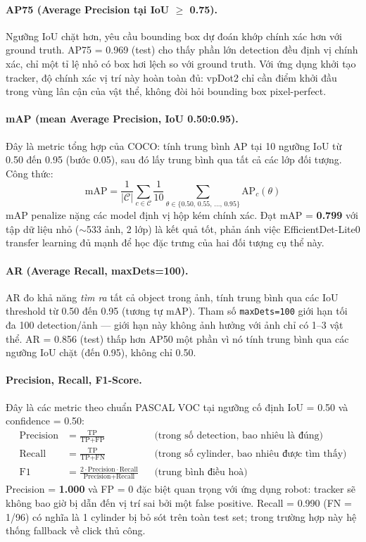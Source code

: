 \paragraph{AP75 (Average Precision tại IoU $\geq$ 0.75).}
Ngưỡng IoU chặt hơn, yêu cầu bounding box dự đoán khớp chính
xác hơn với ground truth. AP75 = 0.969 (test) cho thấy phần lớn
detection đều định vị chính xác, chỉ một tỉ lệ nhỏ có box hơi
lệch so với ground truth. Với ứng dụng khởi tạo tracker, độ
chính xác vị trí này hoàn toàn đủ: vpDot2 chỉ cần điểm khởi đầu
trong vùng lân cận của vật thể, không đòi hỏi bounding box
pixel-perfect.

\paragraph{mAP (mean Average Precision, IoU 0.50:0.95).}
Đây là metric tổng hợp của COCO: tính trung bình AP tại 10
ngưỡng IoU từ 0.50 đến 0.95 (bước 0.05), sau đó lấy trung bình
qua tất cả các lớp đối tượng. Công thức:
\[
  \text{mAP}
  = \frac{1}{|\mathcal{C}|}
    \sum_{c \in \mathcal{C}}
    \frac{1}{10}
    \sum_{\theta \in \{0.50,\,0.55,\,\ldots,\,0.95\}}
    \text{AP}_{c}(\theta)
\]
mAP penalize nặng các model định vị hộp kém chính xác. Đạt
mAP = \textbf{0.799} với tập dữ liệu nhỏ ($\sim$533 ảnh, 2 lớp)
là kết quả tốt, phản ánh việc EfficientDet-Lite0 transfer
learning đủ mạnh để học đặc trưng của hai đối tượng cụ thể này.

\paragraph{AR (Average Recall, maxDets=100).}
AR đo khả năng \textit{tìm ra} tất cả object trong ảnh, tính trung
bình qua các IoU threshold từ 0.50 đến 0.95 (tương tự mAP). Tham
số \texttt{maxDets=100} giới hạn tối đa 100 detection/ảnh --- giới
hạn này không ảnh hưởng với ảnh chỉ có 1--3 vật thể. AR = 0.856
(test) thấp hơn AP50 một phần vì nó tính trung bình qua các
ngưỡng IoU chặt (đến 0.95), không chỉ 0.50.

\paragraph{Precision, Recall, F1-Score.}
Đây là các metric theo chuẩn PASCAL VOC tại ngưỡng cố định
IoU = 0.50 và confidence = 0.50:
\begin{align*}
  \text{Precision} &= \frac{\text{TP}}{\text{TP}+\text{FP}}
    &&\text{(trong số detection, bao nhiêu là đúng)} \\[4pt]
  \text{Recall}    &= \frac{\text{TP}}{\text{TP}+\text{FN}}
    &&\text{(trong số cylinder, bao nhiêu được tìm thấy)} \\[4pt]
  \text{F1}        &= \frac{2 \cdot \text{Precision} \cdot \text{Recall}}
                          {\text{Precision}+\text{Recall}}
    &&\text{(trung bình điều hoà)}
\end{align*}
Precision = \textbf{1.000} và FP = 0 đặc biệt quan trọng với ứng
dụng robot: tracker sẽ không bao giờ bị dẫn đến vị trí sai bởi
một false positive. Recall = 0.990 (FN = 1/96) có nghĩa là 1
cylinder bị bỏ sót trên toàn test set; trong trường hợp này hệ
thống fallback về click thủ công.

